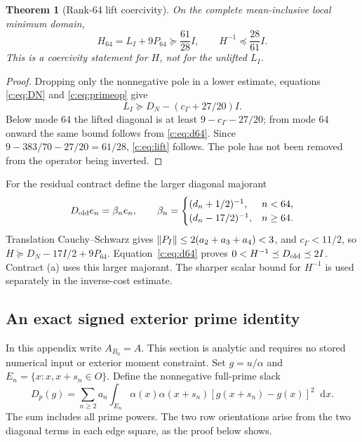 \documentclass[11pt,a4paper]{article}
\numberwithin{equation}{section}
\newtheorem{theorem}{Theorem}[section]
\theoremstyle{definition}\newtheorem{definition}[theorem]{Definition}
\theoremstyle{remark}\newtheorem{remark}[theorem]{Remark}
\newcommand{\dd}{\mathop{}\!\mathrm d}\newcommand{\one}{\mathbf1}
\newcommand{\PP}{P}\newcommand{\J}{J}\newcommand{\V}{V}\newcommand{\wo}{\mathcal W}
\begin{document}
\begin{theorem}[Rank-64 lift coercivity]\label{c:thm:lift}
On the complete mean-inclusive local minimum domain,
\begin{equation}\label{c:eq:lift}
 H_{64}=L_I+9P_{64}\succeq\frac{61}{28}I,
 \qquad H^{-1}\preceq\frac{28}{61}I.
\end{equation}
This is a coercivity statement for $H$, not for the unlifted $L_I$.
\end{theorem}
\begin{proof}
Dropping only the nonnegative pole in a lower estimate, equations
\eqref{c:eq:DN} and \eqref{c:eq:primeop} give
\[
 L_I\succeq D_N-(c_\Gamma+27/20)I.
\]
Below mode 64 the lifted diagonal is at least $9-c_\Gamma-27/20$;
from mode 64 onward the same bound follows from \eqref{c:eq:d64}.
Since $9-383/70-27/20=61/28$, \eqref{c:eq:lift} follows.
The pole has not been removed from the operator being inverted.
\end{proof}
For the residual contract define the larger diagonal majorant
\begin{equation}\label{c:eq:Dold}
 D_{\rm old}e_n=\beta_ne_n,\qquad
 \beta_n=\begin{cases}(d_n+1/2)^{-1},&n<64,\\
 (d_n-17/2)^{-1},&n\ge64.
 \end{cases}
\end{equation}
Translation Cauchy--Schwarz gives
$\norm{\PP_I}\le2(a_2+a_3+a_4)<3$, and
$c_\Gamma<11/2$, so $H\succeq D_N-17I/2+9P_{64}$.
Equation~\eqref{c:eq:d64} proves
$0<H^{-1}\preceq D_{\rm old}\preceq2I$.
Contract (a) uses this larger majorant. The sharper scalar bound for $H^{-1}$ is used separately in the inverse-cost estimate.

\subsection{An exact signed exterior prime identity}\label{c:sec:signed}
In this appendix write $A_{B_0}=A$.
This section is analytic and requires no stored numerical input or
exterior moment constraint. Set $g=u/\alpha$ and
$E_n=\{x:x,x+s_n\in O\}$. Define the nonnegative full-prime slack
\begin{equation}\label{c:eq:slack}
 D_p(g)=\sum_{n\ge2}a_n\int_{E_n}
 \alpha(x)\alpha(x+s_n)[g(x+s_n)-g(x)]^2\dd x.
\end{equation}
The sum includes all prime powers. The two row orientations arise from
the two diagonal terms in each edge square, as the proof below shows.
\end{document}
